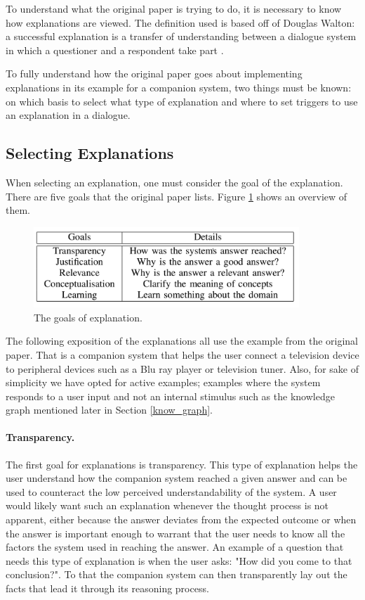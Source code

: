 \documentclass[a4paper]{article}
\begin{document}
To understand what the original paper is trying to do, it is necessary to know how explanations are viewed. The definition used is based off of Douglas Walton: a successful explanation is a transfer of understanding between a dialogue system in which a questioner and a respondent take part \cite{walton2004new}.

To fully understand how the original paper goes about implementing explanations in its example for a companion system, two things must be known: on which basis to select what type of explanation and where to set triggers to use an explanation in a dialogue.

\subsection{Selecting Explanations}

When selecting an explanation, one must consider the goal of the explanation. There are five goals that the original paper lists. Figure \ref{fig:goals} shows an overview of them.

\begin{figure}[H]
	\centering
	\includegraphics[width=10cm]{goals.png}
	\caption{The goals of explanation.}
	\label{fig:goals}
\end{figure}

The following exposition of the explanations all use the example from the original paper. That is a companion system that helps the user connect a television device to peripheral devices such as a Blu ray player or television tuner. Also, for sake of simplicity we have opted for active examples; examples where the system responds to a user input and not an internal stimulus such as the knowledge graph mentioned later in Section \ref{know_graph}.

\paragraph{Transparency.} The first goal for explanations is transparency. This type of explanation helps the user understand how the companion system reached a given answer and can be used to counteract the low perceived understandability of the system. A user would likely want such an explanation whenever the thought process is not apparent, either because the answer deviates from the expected outcome or when the answer is important enough to warrant that the user needs to know all the factors the system used in reaching the answer. An example of a question that needs this type of explanation is when the user asks: "How did you come to that conclusion?". To that the companion system can then transparently lay out the facts that lead it through its reasoning process.
\end{document}
